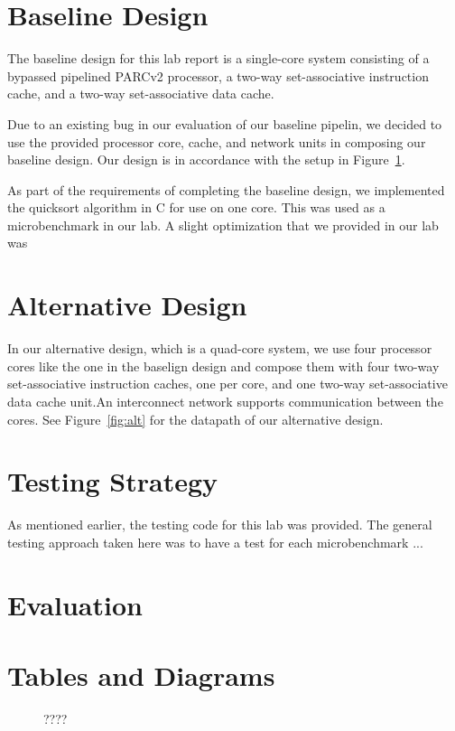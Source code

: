 \documentclass[10pt]{article}
\begin{document}
\section{Baseline Design}

The baseline design for this lab report is a single-core system consisting of a bypassed pipelined PARCv2 
processor, a two-way set-associative instruction cache, and a two-way set-associative data cache.

Due to an existing bug in our evaluation of our baseline pipelin, we decided to use the provided processor core, cache, and network units in composing our baseline design. Our design is in accordance with the setup in Figure~\ref{fig:bline}.

As part of the requirements of completing the baseline design, we implemented the quicksort algorithm in C for use on
one core. This was used as a microbenchmark in our lab. A slight optimization that we provided in our lab was 



\section{Alternative Design}

In our alternative design, which is a quad-core system, we use four processor cores like the one in the baselign design and compose them with four two-way set-associative instruction caches, one per core, and one two-way set-associative data cache unit.An interconnect network supports communication between the cores. See Figure~\ref{fig:alt} for the datapath of our alternative design.



\section{Testing Strategy}

As mentioned earlier, the testing code for this lab was provided. The general testing approach taken here was to have a test for each microbenchmark ...



\section{Evaluation}

% 


\newpage
\section {Tables and Diagrams}


\begin{figure}[h]
	\centering
	\label{fig:bline}
	\caption{????}
\end{figure}
\end{document}
